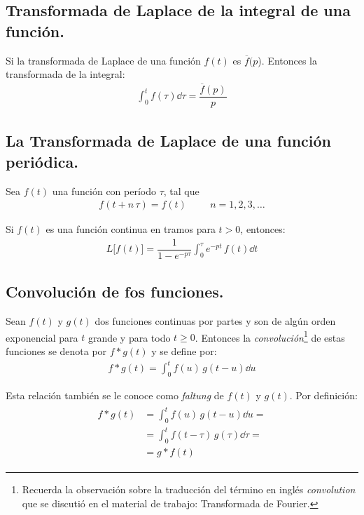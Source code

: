 \subsection{Transformada de Laplace de la integral de una función.}

Si la transformada de Laplace de una función $f(t)$ es $\overline{f}(p$). Entonces la transformada de la integral:
\begin{align}
\int_{0}^{t} f(\tau) \dd{\tau} = \dfrac{\overline{f}(p)}{p}
\label{eq:ecuacion_03_16}
\end{align}

\subsection{La Transformada de Laplace de una función periódica.}

Sea $f(t)$ una función con período $\tau$, tal que 
\begin{align*}
f(t + n \, \tau) = f(t) \hspace{1cm} n = 1, 2, 3, \ldots
\end{align*}

Si $f(t)$ es una función continua en tramos para $t > 0$, entonces:
\begin{align}
L \big[f(t)\big] = \dfrac{1}{1 - e^{-p \tau}} \int_{0}^{\tau} e^{-p t} \, f(t) \dd{t}
\end{align}

\subsection{Convolución de fos funciones.}

Sean $f (t)$ y $g (t)$ dos funciones continuas por partes y son de algún orden exponencial para $t$ grande y para todo $t \geq 0$. Entonces la \emph{convolución}\footnote{Recuerda la observación sobre la traducción del término en inglés \emph{convolution} que se discutió en el material de trabajo: Transformada de Fourier.} de estas funciones se denota por $f * g (t)$ y se define por:
\begin{align}
f * g(t) = \int_{0}^{t} f(u) \, g(t - u) \dd{u}
\label{03_55}
\end{align}

Esta relación también se le conoce como \emph{faltung} de $f(t)$ y $g(t)$. Por definición:
\begin{align}
\begin{aligned}
f * g(t) &= \int_{0}^{t} f(u) \, g(t - u) \dd{u} = \\[0.5em]
&= \int_{0}^{t} f(t - \tau) \, g(\tau) \dd{\tau} = \\[0.5em]
&= g * f(t)
\end{aligned}
\label{eq:ecuacion_03_56}
\end{align}

